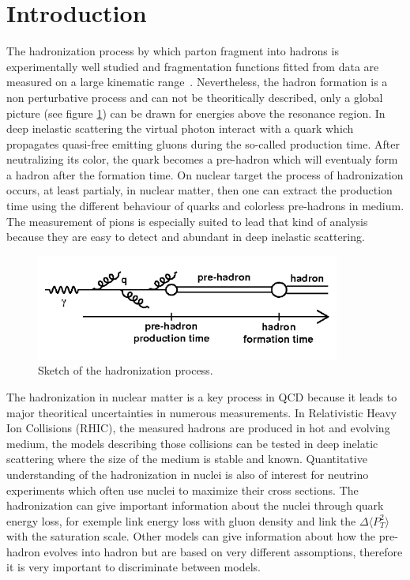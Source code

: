 
\section{Introduction}
\label{physics}

The hadronization process by which parton fragment into hadrons is 
experimentally well studied and fragmentation functions fitted from 
data are measured on a large kinematic range~\cite{Albino:2008fy}.
Nevertheless, the hadron formation is a non perturbative process and can not 
be theoritically described, only a global picture 
(see figure \ref{fig:hadro}) can be drawn for
energies above the resonance region. In deep inelastic scattering the
virtual photon interact with a quark which propagates quasi-free emitting
gluons during the 
so-called production time. After neutralizing its color, the quark becomes 
a pre-hadron which will eventualy form a hadron after the formation time.
On nuclear target the process of hadronization occurs, at least partialy, in 
nuclear matter, then one can extract the production time using the different 
behaviour of quarks and colorless pre-hadrons in medium. The measurement of
pions is especially suited to lead that kind of analysis because they are easy
to detect and abundant in deep inelastic scattering.

\begin{figure}[htbp]
\centering
\includegraphics[width=10cm] {fig/hadro.png} 
\caption {Sketch of the hadronization process.}
\label{fig:hadro}
\end{figure}

The hadronization in nuclear matter is a key process in QCD 
because it leads to major theoritical uncertainties in numerous measurements.
In Relativistic Heavy Ion Collisions (RHIC), the 
measured hadrons are produced in hot and evolving 
medium, the models describing those collisions can be tested in deep inelatic scattering 
where the size of the medium is stable and known. Quantitative
understanding of the hadronization in nuclei is also of interest for
neutrino experiments which often use nuclei to maximize their cross sections.
The hadronization can give important information about the 
nuclei through quark energy loss, for exemple \cite{Arleo:2003yf} link 
energy loss with gluon density and \cite{Kopeliovich:2010aa} link the $\Delta \langle
P_T^2 \rangle$ with the saturation scale. Other models \cite{Gallmeister:2007an}
can give information about how the pre-hadron evolves into hadron but are based
on very different assomptions, therefore it is very important to discriminate between
models. 

